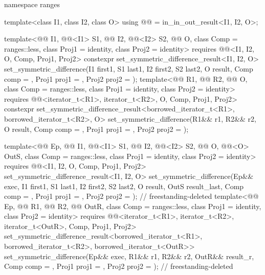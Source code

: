 \begin{codeblock}
{  namespace ranges {
    template<class I1, class I2, class O>
      using @@ = in_in_out_result<I1, I2, O>;

    template<@@ I1, @@<I1> S1, @@ I2, @@<I2> S2,
             @@ O, class Comp = ranges::less,
             class Proj1 = identity, class Proj2 = identity>
      requires @@<I1, I2, O, Comp, Proj1, Proj2>
      constexpr set_symmetric_difference_result<I1, I2, O>
        set_symmetric_difference(I1 first1, S1 last1, I2 first2, S2 last2, O result,
                                 Comp comp = {}, Proj1 proj1 = {},
                                 Proj2 proj2 = {});
    template<@@ R1, @@ R2, @@ O,
             class Comp = ranges::less, class Proj1 = identity, class Proj2 = identity>
      requires @@<iterator_t<R1>, iterator_t<R2>, O, Comp, Proj1, Proj2>
      constexpr set_symmetric_difference_result<borrowed_iterator_t<R1>,
                                                borrowed_iterator_t<R2>, O>
        set_symmetric_difference(R1&& r1, R2&& r2, O result, Comp comp = {},
                                 Proj1 proj1 = {}, Proj2 proj2 = {});

    template<@@ Ep, @@ I1, @@<I1> S1,
             @@ I2, @@<I2> S2,
             @@ O, @@<O> OutS, class Comp = ranges::less,
             class Proj1 = identity, class Proj2 = identity>
      requires @@<I1, I2, O, Comp, Proj1, Proj2>
      set_symmetric_difference_result<I1, I2, O>
        set_symmetric_difference(Ep&& exec, I1 first1, S1 last1, I2 first2, S2 last2,
                                 O result, OutS result_last, Comp comp = {},
                                 Proj1 proj1 = {}, Proj2 proj2 = {});       // freestanding-deleted
    template<@@ Ep, @@ R1, @@ R2,
             @@ OutR, class Comp = ranges::less,
             class Proj1 = identity, class Proj2 = identity>
      requires @@<iterator_t<R1>, iterator_t<R2>, iterator_t<OutR>, Comp, Proj1, Proj2>
      set_symmetric_difference_result<borrowed_iterator_t<R1>, borrowed_iterator_t<R2>,
                                      borrowed_iterator_t<OutR>>
        set_symmetric_difference(Ep&& exec, R1&& r1, R2&& r2, OutR&& result_r, Comp comp = {},
                                 Proj1 proj1 = {}, Proj2 proj2 = {});       // freestanding-deleted
  }

}
\end{codeblock}
